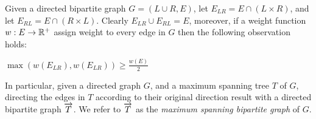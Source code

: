 \label{sub:bipartition}
Given a directed bipartite graph $G = (L\cup R, E)$, 
let $E_{LR} = E \cap (L \times R)$, 
and let $E_{RL} = E \cap (R \times L)$.
Clearly $E_{LR} \cup E_{RL} = E$, moreover, 
if a weight function $w:E \rightarrow \mathbb{R^+}$ 
assign weight to every edge in $G$ then the following observation holds:
\begin{observation}
\label{ob:bipartition}
$\max(w(E_{LR}), w(E_{LR})) \geq \frac{w(E)}{2}$
\end{observation}

In particular, given a directed graph $G$, 
and a maximum spanning tree $T$ of $G$, 
directing the edges in $T$ according to their original direction result 
with a directed bipartite graph $\overrightarrow{T}$.
We refer to $\overrightarrow{T}$ as the \emph{maximum spanning bipartite graph}
of $G$.